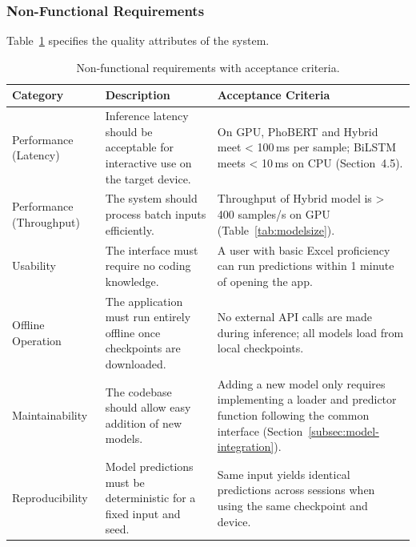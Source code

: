 \documentclass[12pt]{report} %
\begin{document}
\subsubsection{Non-Functional Requirements}

Table~\ref{tab:nonfunctional-requirements} specifies the quality attributes of the system.

\begin{table}[H]
    \centering
    \caption{Non-functional requirements with acceptance criteria.}
    \label{tab:nonfunctional-requirements}
    \begin{tabular}{p{2.5cm}p{4.5cm}p{4cm}}
        \hline
        \textbf{Category}        & \textbf{Description}                                                             & \textbf{Acceptance Criteria}                                                                                                                           \\
        \hline
        Performance (Latency)    & Inference latency should be acceptable for interactive use on the target device. & On GPU, PhoBERT and Hybrid meet < 100\,ms per sample; BiLSTM meets < 10\,ms on CPU (Section~4.5).                                                      \\
        Performance (Throughput) & The system should process batch inputs efficiently.                              & Throughput of Hybrid model is > 400 samples/s on GPU (Table~\ref{tab:modelsize}).                                                                      \\
        Usability                & The interface must require no coding knowledge.                                  & A user with basic Excel proficiency can run predictions within 1 minute of opening the app.                                                            \\
        Offline Operation        & The application must run entirely offline once checkpoints are downloaded.       & No external API calls are made during inference; all models load from local checkpoints.                                                               \\
        Maintainability          & The codebase should allow easy addition of new models.                           & Adding a new model only requires implementing a loader and predictor function following the common interface (Section~\ref{subsec:model-integration}). \\
        Reproducibility          & Model predictions must be deterministic for a fixed input and seed.              & Same input yields identical predictions across sessions when using the same checkpoint and device.                                                     \\
        \hline
    \end{tabular}
\end{table}
\end{document}
